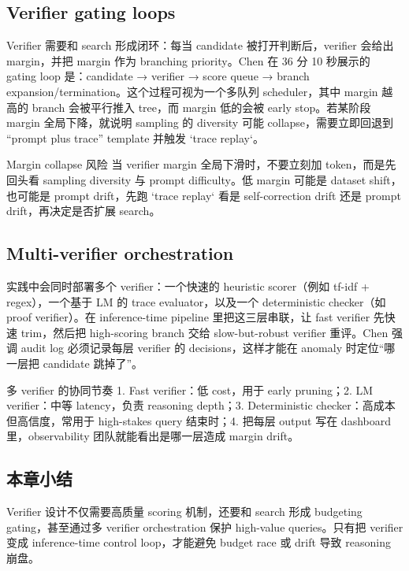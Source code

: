 \documentclass[a4paper]{article}
\begin{document}
\subsection{Verifier gating loops}
Verifier 需要和 search 形成闭环：每当 candidate 被打开判断后，verifier 会给出 margin，并把 margin 作为 branching priority。Chen 在 36 分 10 秒展示的 gating loop 是：candidate → verifier → score queue → branch expansion/termination。这个过程可视为一个多队列 scheduler，其中 margin 越高的 branch 会被平行推入 tree，而 margin 低的会被 early stop。若某阶段 margin 全局下降，就说明 sampling 的 diversity 可能 collapse，需要立即回退到 “prompt plus trace” template 并触发 `trace replay`。

\begin{warningbox}{Margin collapse 风险}
当 verifier margin 全局下滑时，不要立刻加 token，而是先回头看 sampling diversity 与 prompt difficulty。低 margin 可能是 dataset shift，也可能是 prompt drift，先跑 `trace replay` 看是 self-correction drift 还是 prompt drift，再决定是否扩展 search。
\end{warningbox}

\subsection{Multi-verifier orchestration}
实践中会同时部署多个 verifier：一个快速的 heuristic scorer（例如 tf-idf + regex），一个基于 LM 的 trace evaluator，以及一个 deterministic checker（如 proof verifier）。在 inference-time pipeline 里把这三层串联，让 fast verifier 先快速 trim，然后把 high-scoring branch 交给 slow-but-robust verifier 重评。Chen 强调 audit log 必须记录每层 verifier 的 decisions，这样才能在 anomaly 时定位“哪一层把 candidate 跳掉了”。

\begin{knowledgebox}{多 verifier 的协同节奏}
1. Fast verifier：低 cost，用于 early pruning；2. LM verifier：中等 latency，负责 reasoning depth；3. Deterministic checker：高成本但高信度，常用于 high-stakes query 结束时；4. 把每层 output 写在 dashboard 里，observability 团队就能看出是哪一层造成 margin drift。
\end{knowledgebox}

\subsection{本章小结}
Verifier 设计不仅需要高质量 scoring 机制，还要和 search 形成 budgeting gating，甚至通过多 verifier orchestration 保护 high-value queries。只有把 verifier 变成 inference-time control loop，才能避免 budget race 或 drift 导致 reasoning 崩盘。
\end{document}
